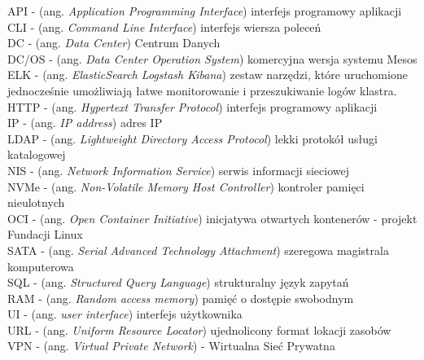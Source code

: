 \documentclass[10pt,a4paper,titlepage,twoside]{report}
\begin{document}
API - (ang. \textit{Application Programming Interface}) interfejs programowy aplikacji \\ \newline
CLI - (ang. \textit{Command Line Interface}) interfejs wiersza poleceń \\ \newline
DC - (ang. \textit{Data Center}) Centrum Danych \\ \newline
DC/OS - (ang. \textit{Data Center Operation System}) komercyjna wersja systemu Mesos \\ \newline
ELK - (ang. \textit{ElasticSearch Logstash Kibana}) zestaw narzędzi, które uruchomione jednocześnie umożliwiają łatwe monitorowanie i przeszukiwanie logów klastra. \\ \newline
HTTP - (ang. \textit{Hypertext Transfer Protocol}) interfejs programowy aplikacji \\ \newline
IP - (ang. \textit{IP address}) adres IP \\ \newline
LDAP - (ang. \textit{Lightweight Directory Access Protocol}) lekki protokół usługi katalogowej \\ \newline
NIS - (ang. \textit{Network Information Service}) serwis informacji sieciowej \\ \newline
NVMe - (ang. \textit{Non-Volatile Memory Host Controller}) kontroler pamięci nieulotnych \\ \newline
OCI - (ang. \textit{Open Container Initiative}) inicjatywa otwartych kontenerów - projekt Fundacji Linux \\ \newline
SATA - (ang. \textit{Serial Advanced Technology Attachment}) szeregowa magistrala komputerowa \\ \newline
SQL - (ang. \textit{Structured Query Language}) strukturalny język zapytań \\ \newline
RAM - (ang. \textit{Random access memory}) pamięć o dostępie swobodnym \\ \newline
UI - (ang. \textit{user interface}) interfejs użytkownika \\ \newline
URL - (ang. \textit{Uniform Resource Locator}) ujednolicony format lokacji zasobów \\ \newline
VPN - (ang. \textit{Virtual Private Network}) - Wirtualna Sieć Prywatna \\ \newline
\end{document}
